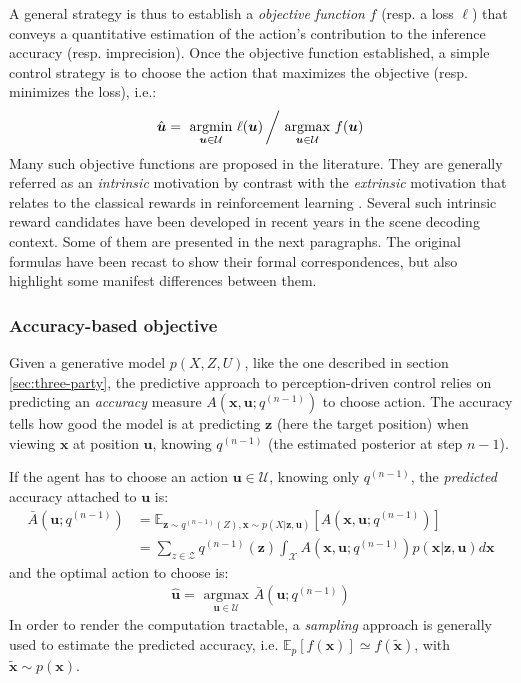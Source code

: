 \documentclass[12pt,twoside,openright]{article}
\begin{document}
A general strategy is thus to establish a \emph{objective function} $f$ (resp. a loss $\ell$) that conveys a quantitative estimation of the action's contribution to the inference accuracy (resp. imprecision). Once the objective function established, a simple control strategy is to choose the action that maximizes the objective (resp. minimizes the loss), i.e.:
\begin{align}
\hat{\boldsymbol{u}} = \underset{\boldsymbol{u}\in\mathcal{U}}{\text{ argmin }}  \ell(\boldsymbol{u})\left/ \underset{\boldsymbol{u}\in\mathcal{U}}{\text{ argmax }}  f(\boldsymbol{u})\right.
\end{align}
Many such objective functions are proposed in the literature. They are generally referred as an \emph{intrinsic} motivation \citep{oudeyer2008can} by contrast with the \emph{extrinsic} motivation that relates to the classical rewards in reinforcement learning \citep{sutton1998reinforcement}. {\color{Purple} Several such intrinsic reward candidates have been developed in recent years in the scene decoding context. Some of them are presented in the next paragraphs. The original formulas have been recast to show their formal correspondences, but also highlight some manifest differences between them.}

\subsubsection{Accuracy-based objective}\label{sec:infomax}

Given a generative model $p(X,Z,U)$, like the one described in section \ref{sec:three-party}, the predictive approach to perception-driven control \citep{najemnik2005optimal} relies on predicting an \emph{accuracy} measure $A(\boldsymbol{x}, \boldsymbol{u}; q^{(n-1)})$ to choose action. 
The accuracy tells how good the model is at predicting $\boldsymbol{z}$ (here the target position) when viewing $\boldsymbol{x}$ at position $\boldsymbol{u}$,
knowing $q^{(n-1)}$ (the estimated posterior at step $n-1$).

If the agent has to choose an action $\boldsymbol{u} \in \mathcal{U}$, knowing only $q^{(n-1)}$, the \emph{predicted} accuracy attached to $\boldsymbol{u}$ is:
\begin{align*}
\bar{A}(\boldsymbol{u}; q^{(n-1)})
&= \mathbb{E}_{\boldsymbol{z} \sim q^{(n-1)}(Z), \boldsymbol{x} \sim p(X|\boldsymbol{z}, \boldsymbol{u})}\left[A(\boldsymbol{x}, \boldsymbol{u}; q^{(n-1)})\right]  \\
&= \sum_{z\in\mathcal{Z}} q^{(n-1)}(\boldsymbol{z}) \int_{\mathcal{X}}  A(\boldsymbol{x}, \boldsymbol{u}; q^{(n-1)}) p(\boldsymbol{x}|\boldsymbol{z}, \boldsymbol{u}) d\boldsymbol{x}  
\end{align*}
and the optimal action to choose is:
\begin{align}
\hat{\boldsymbol{u}} = \underset{\boldsymbol{u} \in \mathcal{U}}{\text{ argmax }} \bar{A}(\boldsymbol{u}; q^{(n-1)})\label{eq:predictive-policy}
\end{align} 
In order to render the computation tractable, a \emph{sampling} approach is generally used to estimate the predicted accuracy, i.e. $\mathbb{E}_p[f(\boldsymbol{x})] \simeq f(\tilde{\boldsymbol{x}})$, with $\tilde{\boldsymbol{x}}\sim p(\boldsymbol{x})$.
\end{document}
